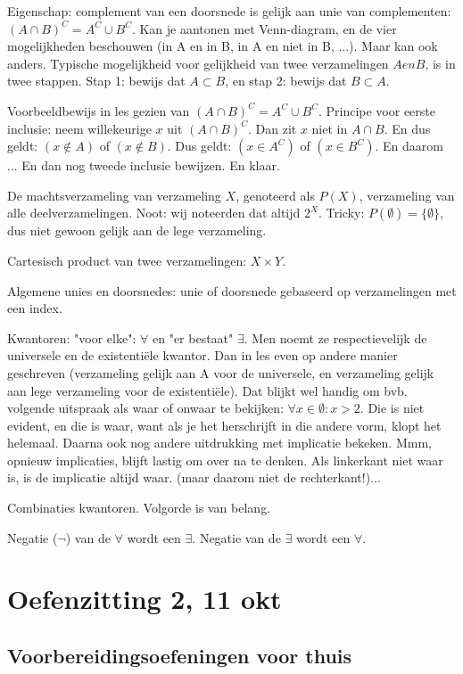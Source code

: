\documentclass{article}
\begin{document}
Eigenschap: complement van een doorsnede is gelijk aan unie van complementen: $(A \cap B)^C = A^C \cup B^C$. Kan je aantonen met Venn-diagram, en de vier mogelijkheden beschouwen (in A en in B, in A en niet in B, ...). Maar kan ook anders. Typische mogelijkheid voor gelijkheid van twee verzamelingen $A en B$, is in twee stappen. Stap 1: bewijs dat $A \subset B$, en stap 2: bewijs dat $B \subset A$. 

Voorbeeldbewijs in les gezien van $(A \cap B)^C = A^C \cup B^C$. Principe voor eerste inclusie: neem willekeurige $x$ uit $(A \cap B)^C$. Dan zit  $x$ niet in $A \cap B$. En dus geldt: $(x\notin A)$ of $(x\notin B)$. Dus geldt: $(x \in A^C)$ of $(x\in B^C)$. En daarom ... En dan nog tweede inclusie bewijzen. En klaar. 

De machtsverzameling van verzameling $X$, genoteerd als $P(X)$, verzameling van alle deelverzamelingen. Noot: wij noteerden dat altijd $2^X$. Tricky: $P(\emptyset) = \{ \emptyset \}$, dus niet gewoon gelijk aan de lege verzameling. 

Cartesisch product van twee verzamelingen: $X \times Y$. 

Algemene unies en doorsnedes: unie of doorsnede gebaseerd op verzamelingen met een index. 

Kwantoren: "voor elke": $\forall$  en "er bestaat" $\exists$. Men noemt ze respectievelijk  de universele en de existenti\"ele kwantor. Dan in les even op andere manier geschreven (verzameling gelijk aan A voor de universele, en verzameling gelijk aan lege verzameling voor de existenti\"ele). Dat blijkt wel handig om bvb. volgende uitspraak als waar of onwaar te bekijken: $\forall x \in \emptyset : x>2$. Die is niet evident, en die is waar, want als je het herschrijft in die andere vorm, klopt het helemaal. 
Daarna ook nog andere uitdrukking met implicatie bekeken. Mmm, opnieuw implicaties, blijft lastig om over na te denken. Als linkerkant niet waar is, is de implicatie altijd waar. (maar daarom niet de rechterkant!)... 

Combinaties kwantoren. Volgorde is van belang. 

Negatie ($\lnot$) van de $\forall$ wordt een $\exists$. Negatie van de $\exists$ wordt een $\forall$. 

\section{Oefenzitting 2, 11 okt}


\subsection{Voorbereidingsoefeningen voor thuis} 
\end{document}

